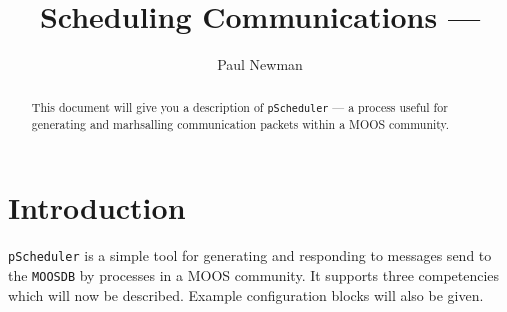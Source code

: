 \documentclass[a4paper,10pt]{article}
\title{Scheduling Communications --- \code{pScheduler}}
\author{Paul Newman}
\newcommand{\Code}[1]{\texttt{#1} }
\newcommand{\code}[1]{\Code{#1} }
\begin{document}
\maketitle

\begin{center}
\end{center}
\begin{abstract}
This document will give you a description of \code{pScheduler} ---  a process useful for generating and marhsalling communication packets within a MOOS community.
\end{abstract}

\section{Introduction}\label{Sec:pScheduler}

\code{pScheduler} is a simple tool for generating and responding
to messages send to the \code{MOOSDB} by processes in a MOOS
community. It supports three competencies which will now be
described. Example configuration blocks will also be given.
\end{document}

